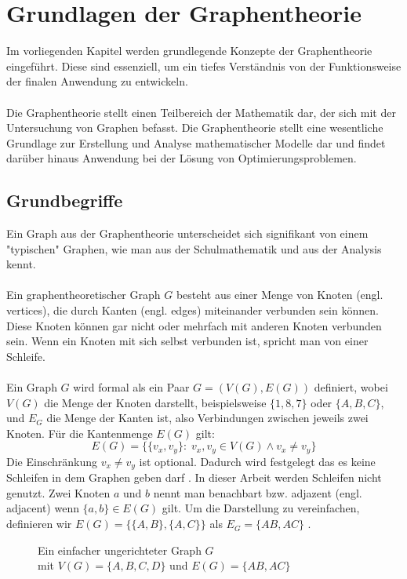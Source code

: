 \newpage
\section{Grundlagen der Graphentheorie}
Im vorliegenden Kapitel werden grundlegende Konzepte der Graphentheorie eingeführt. 
Diese sind essenziell, um ein tiefes Verständnis von der Funktionsweise der finalen Anwendung zu entwickeln.\\\\
Die Graphentheorie stellt einen Teilbereich der Mathematik dar, der sich mit der Untersuchung von Graphen befasst. 
Die Graphentheorie stellt eine wesentliche Grundlage zur Erstellung und Analyse mathematischer Modelle dar und findet darüber hinaus Anwendung bei der Lösung von Optimierungsproblemen.
\subsection{Grundbegriffe}
Ein Graph aus der Graphentheorie unterscheidet sich signifikant von einem "typischen" Graphen, wie man aus der Schulmathematik und aus der Analysis kennt.\\\\
Ein graphentheoretischer Graph $G$ besteht aus einer Menge von Knoten (engl. vertices), die durch Kanten (engl. edges) miteinander verbunden sein können. 
Diese Knoten können gar nicht oder mehrfach mit anderen Knoten verbunden sein. 
Wenn ein Knoten mit sich selbst verbunden ist, spricht man von einer Schleife. \\\\
Ein Graph $G$ wird formal als ein Paar $G = (V(G), E(G))$ definiert, wobei \(V(G)\) die Menge der Knoten darstellt, beispielsweise \(\{1, 8, 7\}\) oder \(\{A, B, C\}\), und \(E_G\) die Menge der Kanten ist, also Verbindungen zwischen jeweils zwei Knoten.
Für die Kantenmenge \(E(G)\) gilt: 
\begin{equation*}
    E(G) = \{\{v_x, v_y\} \colon \; v_x, v_y \in V(G) \wedge v_x \neq v_y\}
\end{equation*}
Die Einschränkung $v_x \neq v_y$ ist optional.
Dadurch wird festgelegt das es keine Schleifen in dem Graphen geben darf \parencite[2]{Diestel2017-bj}.
In dieser Arbeit werden Schleifen nicht genutzt. Zwei Knoten $a$ und $b$ nennt man benachbart bzw. adjazent (engl. adjacent) wenn $\{a,b\} \in E(G)$ gilt. 
Um die Darstellung zu vereinfachen, definieren wir $E(G) = \{\{A,B\},\{A,C\}\}$ als $E_G = \{AB, AC\}$ \parencite[3]{Diestel2017-bj}.
\begin{figure}[H]
    \centering
    
    \caption[caption]{Ein einfacher ungerichteter Graph $G$ \\ mit $V(G)=\{A,B,C,D\}$ und $E(G)=\{{AB, AC}\}$ }
    \label{g1}
\end{figure}
